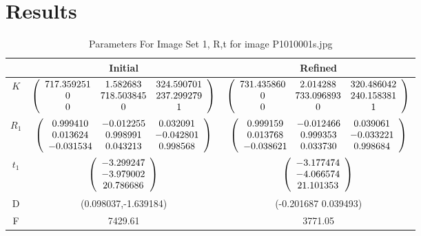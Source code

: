 \documentclass[12pt]{article}
\begin{document}
\section{Results}
\tiny
\begin{table}[!h]
\centering
\begin{tabular}{|c|c|c|}
\hline
 & Initial & Refined \\
\hline
$K$ & $
\left( {\begin{array}{*{20}c}
   {717.359251} & {1.582683} & {324.590701}  \\
   {0} & {718.503845} & {237.299279}  \\
   {0} & {0} & {1}  \\
\end{array}} \right)
$
& $
\left( {\begin{array}{*{20}c}
   {731.435860} & {2.014288} & {320.486042}  \\
   {0} & {733.096893} & {240.158381}  \\
   {0} & {0} & {1}  \\
\end{array}} \right)
$\\
\hline
$R_1$ & $
\left( {\begin{array}{*{20}c}
   {0.999410} & {-0.012255} & {0.032091}  \\
   {0.013624} & {0.998991} & {-0.042801}  \\
   {-0.031534} & {0.043213} & {0.998568}  \\
\end{array}} \right)
$ & $
\left( {\begin{array}{*{20}c}
   {0.999159} & {-0.012466} & {0.039061}  \\
   {0.013768} & {0.999353} & {-0.033221}  \\
   {-0.038621} & {0.033730} & {0.998684}  \\
\end{array}} \right)
$\\
\hline
$t_1$ & $
\left( {\begin{array}{*{20}c}
   {-3.299247}  \\
   {-3.979002}  \\
   {20.786686}  \\
\end{array}} \right)
$
& $
\left( {\begin{array}{*{20}c}
   {-3.177474}  \\
   {-4.066574}  \\
   {21.101353 }  \\
\end{array}} \right)
$
\\
\hline
D & (0.098037,-1.639184) &(-0.201687 0.039493) \\
\hline
F & 7429.61 & 3771.05 \\
\hline
\end{tabular}
\caption{Parameters For Image Set 1, R,t for image P1010001s.jpg}
\end{table}
\end{document}
